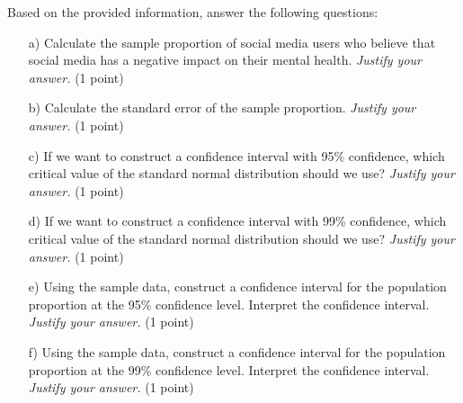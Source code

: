 \documentclass{article}
\begin{document}
Based on the provided information, answer the following questions:

\begin{enumerate}
\item[a)] Calculate the sample proportion of social media users who believe that social media has a negative impact on their mental health. \emph{Justify your answer.} (1 point)
\begin{center}
\end{center}
    
\item[b)] Calculate the standard error of the sample proportion. \emph{Justify your answer.} (1 point)
\begin{center}
\end{center}
    
\item[c)] If we want to construct a confidence interval with 95\% confidence, which critical value of the standard normal distribution should we use? \emph{Justify your answer.} (1 point)
    \begin{center}
    \end{center}
    
\item[d)] If we want to construct a confidence interval with 99\% confidence, which critical value of the standard normal distribution should we use? \emph{Justify your answer.} (1 point)
\begin{center}
\end{center}
    
\item[e)] Using the sample data, construct a confidence interval for the population proportion at the 95\% confidence level. Interpret the confidence interval. \emph{Justify your answer.} (1 point)
\begin{center}
\end{center}
    
\item[f)] Using the sample data, construct a confidence interval for the population proportion at the 99\% confidence level. Interpret the confidence interval. \emph{Justify your answer.} (1 point)
\begin{center}
\end{center}
    
\end{enumerate}
\end{document}
